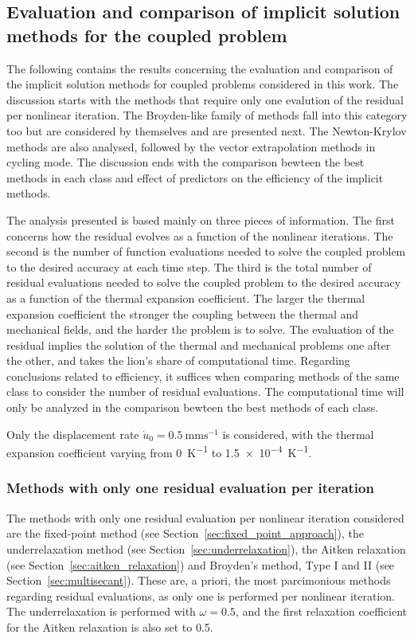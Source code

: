 \FloatBarrier

\subsection{Evaluation and comparison of implicit solution methods for the coupled problem}

The following contains the results concerning the evaluation and comparison of the implicit solution methods for coupled problems considered in this work.
The discussion starts with the methods that require only one evalution of the residual per nonlinear iteration.
The Broyden-like family of methods fall into this category too but are considered by themselves and are presented next.
The Newton-Krylov methods are also analysed, followed by the vector extrapolation methods in cycling mode.
The discussion ends with the comparison bewteen the best methods in each class and effect of predictors on the efficiency of the implicit methods.

The analysis presented is based mainly on three pieces of information.
The first concerns how the residual evolves as a function of the nonlinear iterations.
The second is the number of function evaluations needed to solve the coupled problem to the desired accuracy at each time step.
The third is the total number of residual evaluations needed to solve the coupled problem to the desired accuracy as a function of the thermal expansion coefficient.
The larger the thermal expansion coefficient the stronger the coupling between the thermal and mechanical fields, and the harder the problem is to solve.
The evaluation of the residual implies the solution of the thermal and mechanical problems one after the other, and takes the lion's share of computational time.
Regarding conclusions related to efficiency, it suffices when comparing methods of the same class to consider the number of residual evaluations.
The computational time will only be analyzed in the comparison bewteen the best methods of each class.

Only the displacement rate \(\dot u_0 = \SI{0.5}{\milli\meter\second^{-1}}\) is considered, with the thermal expansion coefficient varying from \SI{0}{\kelvin^{-1}} to \SI{1.5e-4}{\kelvin^{-1}}.

\subsubsection{Methods with only one residual evaluation per iteration}

The methods with only one residual evaluation per nonlinear iteration considered are the fixed-point method (see Section~\ref{sec:fixed_point_approach}), the underrelaxation method (see Section~\ref{sec:underrelaxation}), the Aitken relaxation (see Section~\ref{sec:aitken_relaxation}) and Broyden's method, Type I and II (see Section~\ref{sec:multisecant}).
These are, a priori, the most parcimonious methods regarding residual evaluations, as only one is performed per nonlinear iteration.
The underrelaxation is performed with \(\omega = 0.5\), and the first relaxation coefficient for the Aitken relaxation is also set to 0.5.

